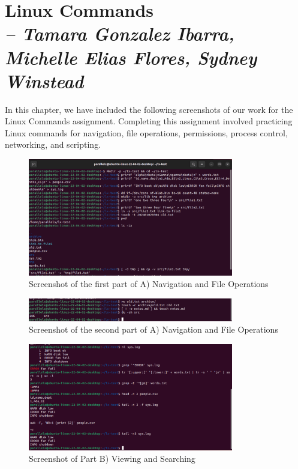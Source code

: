 \chapter{Linux Commands \\
\small{\textit{-- Tamara Gonzalez Ibarra, Michelle Elias Flores, Sydney Winstead}}
\label{Chapter::itLinuxCommands}}

In this chapter, we have included the following screenshots of our work for the Linux Commands assignment. Completing this assignment involved practicing Linux commands for navigation, file operations, permissions, process control, networking, and scripting. 

\begin{figure}[h!]
    \centering
    \includegraphics[width=0.8\textwidth]{linuxptA.png}
    \caption{Screenshot of the first part of A) Navigation and File Operations}
    \label{fig:problemsetA}
\end{figure}
    
\begin{figure}[h!]
    \centering
    \includegraphics[width=0.8\textwidth]{linuxptA2.png}
    \caption{Screenshot of the second part of A) Navigation and File Operations}
    \label{fig:problemsetApt2}
\end{figure}

\begin{figure}[h!]
    \centering
    \includegraphics[width=0.8\textwidth]{linuxptB.png}
    \caption{Screenshot of Part B) Viewing and Searching}
    \label{fig:problemsetB}
\end{figure}

